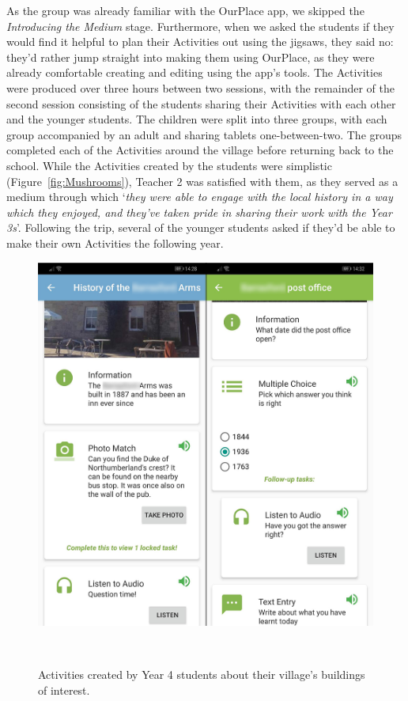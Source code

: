 \documentclass[,hyphens]{sigchi}
\begin{document}
As the group was already familiar with the OurPlace app, we skipped the \textit{Introducing the Medium} stage. Furthermore, when we asked the students if they would find it helpful to plan their Activities out using the jigsaws, they said no: they'd rather jump straight into making them using OurPlace, as they were already comfortable creating and editing using the app's tools. The Activities were produced over three hours between two sessions, with the remainder of the second session consisting of the students sharing their Activities with each other and the younger students. The children were split into three groups, with each group accompanied by an adult and sharing tablets one-between-two. The groups completed each of the Activities around the village before returning back to the school. While the Activities created by the students were simplistic (Figure~\ref{fig:Mushrooms}), Teacher 2 was satisfied with them, as they served as a medium through which `\textit{they were able to engage with the local history in a way which they enjoyed, and they've taken pride in sharing their work with the Year 3s}'. Following the trip, several of the younger students asked if they'd be able to make their own Activities the following year.

\begin{figure}
\centering
  \includegraphics[width=0.9\columnwidth]{figures/createdActivities}
  \caption{Activities created by Year 4 students about their village's buildings of interest. }~\label{fig:CreatedActivities}
\end{figure}
\end{document}
